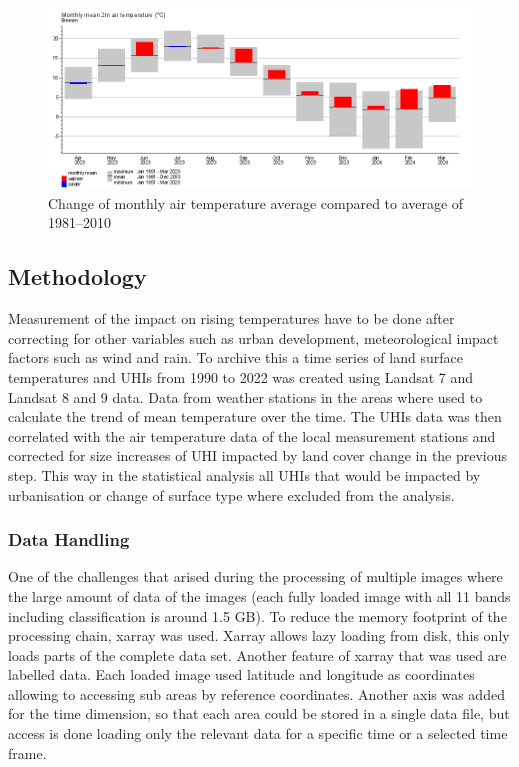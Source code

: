 \documentclass[12pt,a4paper, english,twoside]{scrartcl}
\begin{document}
      \begin{figure}[!htbp]
          \centering
          \includegraphics[width=\textwidth]{img/BremenClimateAvgDiff2023.png}
          \caption{Change of monthly air temperature average compared to average of 1981--2010~\autocite{DWD2024a}\label{fig:monthAvg}}
      \end{figure}
    \subsection{Methodology}
      Measurement of the impact on rising temperatures have to be done after correcting for other variables such as urban development, meteorological impact factors such as wind and rain. 
      To archive this a time series of land surface temperatures and \glspl{UHI} from 1990 to 2022 was created using Landsat 7 and Landsat 8 and 9 data.
      Data from weather stations in the areas where used to calculate the trend of mean temperature over the time. 
      The \glspl{UHI} data was then correlated with the air temperature data of the local measurement stations and corrected for size increases of \gls{UHI} impacted by land cover change in the previous step. 
      This way in the statistical analysis all \glspl{UHI} that would be impacted by urbanisation or change of surface type where excluded from the analysis.
    \subsubsection{Data Handling}
      One of the challenges that arised during the processing of multiple images where the large amount of data of the images (each fully loaded image with all 11 bands including classification is around 1.5 GB).
      To reduce the memory footprint of the processing chain, xarray \autocite{hoyer2017xarray} was used. 
      Xarray allows lazy loading from disk, this only loads parts of the complete data set. 
      Another feature of xarray that was used are labelled data. Each loaded image used latitude and longitude as coordinates allowing to accessing sub areas by reference coordinates. 
      Another axis was added for the time dimension, so that each area could be stored in a single data file, but access is done loading only the relevant data for a specific time or a selected time frame.
  
\end{document}
